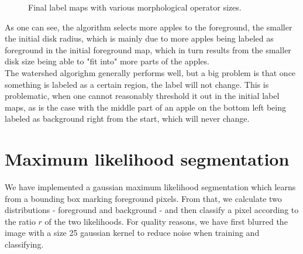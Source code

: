 \documentclass[11pt,a4paper]{article}
\begin{document}
\begin{figure}
\quad
{}
\quad

\caption{Final label maps with various morphological operator sizes.}%
\label{fig:e3}
\end{figure}

As one can see, the algorithm selects more apples to the foreground, the smaller the initial disk radius, which is mainly due to more apples being labeled as foreground in the initial foreground map, which in turn results from the smaller disk size being able to "fit into" more parts of the apples.\\
The watershed algorighm generally performs well, but a big problem is that once something is labeled as a certain region, the label will not change. This is problematic, when one cannot reasonably threshold it out in the initial label maps, as is the case with the middle part of an apple on the bottom left being labeled as background right from the start, which will never change.

\FloatBarrier

\section{Maximum likelihood segmentation}
We have implemented a gaussian maximum likelihood segmentation which learns from a bounding box marking foreground pixels. From that, we calculate two distributions - foreground and background - and then classify a pixel according to the ratio $r$ of the two likelihoods. For quality reasons, we have first blurred the image with a size 25 gaussian kernel to reduce noise when training and classifying.
\end{document}
